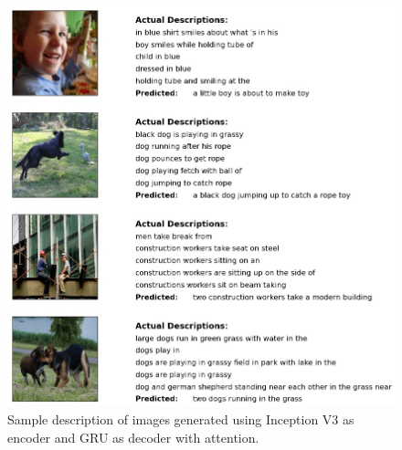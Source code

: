 \begin{figure}[ht!]
    \includegraphics[scale=0.4]{chapters/5/intfig/inception_and_gru_with_attention_output.jpg}
    \caption{Sample description of images generated using Inception V3 as encoder and GRU as decoder with attention.}
    \label{res:inceptionv3_gru_attention}
\end{figure}

